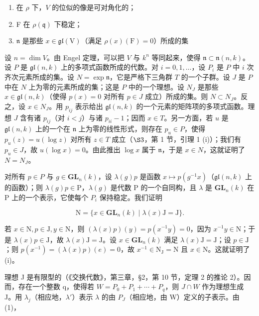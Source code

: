 \begin{enumerate}
\def\labelenumi{(\roman{enumi})}
\item
  在 \(\rho\) 下，\(V\) 的位似的像是可对角化的；
\item
  F 在 \(\rho(\mathfrak{q})\) 下稳定；
\item
  \(\mathfrak{n}\) 是那些 \(x\in \mathfrak{gl}(\mathrm{V})\)（满足 \(\rho (x)(\mathrm{F}) = 0\)）所成的集
\end{enumerate}

设 \(n = \dim V\)。由 Engel 定理，可以把 \(V\) 与 \(k^n\) 等同起来，使得 \(\mathfrak{n} \subset \mathfrak{n}(n,k)\)。设 \(P\) 是 \(\mathfrak{gl}(n,k)\) 上的多项式函数所成的代数。对 \(i = 0,1,\ldots\)，设 \(P_i\) 是 \(P\) 中 \(i\) 次齐次元素所成的集。设 \(N = \exp \mathfrak{n}\)，它是严格下三角群 \(T\) 的一个子群。设 \(J\) 是 \(P\) 中在 \(N\) 上为零的元素所成的集；这是 \(P\) 中的一个理想。设 \(N_J\) 是那些 \(x \in \mathfrak{gl}(n,k)\)（使得 \(p(x) = 0\) 对所有 \(p \in J\) 成立）所成的集。则 \(N \subset N_J\)。反之，设 \(x \in N_J\)。用 \(p_{ij}\) 表示给出 \(\mathfrak{gl}(n,k)\) 的一个元素的矩阵项的多项式函数。理想 \(J\) 含有诸 \(p_{ij}\)（对 \(i < j\)）与诸 \(p_{ii} - 1\)；因而 \(x \in T\)。另一方面，若 \(u\) 是 \(\mathfrak{gl}(n,k)\) 上的一个在 \(\mathfrak{n}\) 上为零的线性形式，则存在 \(p_u \in P\)，使得 \(p_u(z) = u(\log z)\) 对所有 \(z \in T\) 成立（\(\S 3\)，第 1 节，引理 1 (i)）；我们有 \(p_u \in J\)，故 \(u(\log x) = 0\)。由此推出 \(\log x\) 属于 \(\mathfrak{n}\)，于是 \(x \in N\)，这就证明了 \(N = N_J\)。

对所有 \(p \in P\) 与 \(g \in \mathbf{GL}_{n}(k)\)，设 \(\lambda(g)p\) 是函数 \(x \mapsto p(g^{-1}x)\)（\(\mathfrak{gl}(n,k)\) 上的函数）；则 \(\lambda(g)p \in \mathrm{P}\)，\(\lambda(g)\) 是代数 P 的一个自同构，且 \(\lambda\) 是 \(\mathbf{GL}_{n}(k)\) 在 P 上的一个表示，它使每个 \(P_{i}\) 保持稳定。我们证明

\[
\mathrm{N} = \{x \in \mathbf {G L} _ {n} (k) \mid \lambda (x) \mathrm{J} = \mathrm{J} \}.\tag{1}
\]

若 \(x \in \mathrm{N}, p \in \mathrm{J}, y \in \mathrm{N}\)，则 \((\lambda(x)p)(y) = p(x^{-1}y) = 0\)，因为 \(x^{-1}y \in \mathrm{N}\)；于是 \(\lambda(x)p \in \mathrm{J}\)，故 \(\lambda(x)\mathrm{J} = \mathrm{J}\)。设 \(x \in \mathbf{GL}_n(k)\) 满足 \(\lambda(x)\mathrm{J} = \mathrm{J}\)；设 \(p \in \mathrm{J}\)；则 \(p(x^{-1}) = (\lambda(x)p)(e) = 0\)，故 \(x^{-1} \in \mathrm{N}_{\mathrm{J}} = \mathrm{N}\) 且 \(x \in \mathrm{N}\)。这就证明了 (i)。

理想 J 是有限型的（《交换代数》，第三章，§2，第 10 节，定理 2 的推论 2）。因而，存在一个整数 q，使得若 \(W = P_{0} + P_{1} + \cdots + P_{q}\)，则 \(J \cap W\) 作为理想生成 J。用 \(\lambda_{j}\)（相应地，\(\lambda'\)）表示 \(\lambda\) 的由 \(P_{J}\)（相应地，由 W）定义的子表示。由 (1)，

